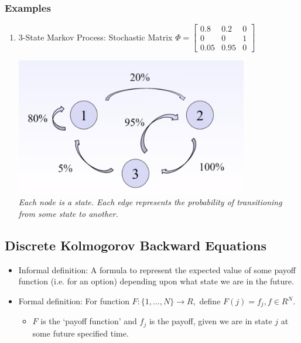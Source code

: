 \documentclass{article}
\begin{document}
\subsubsection{Examples}
\begin{enumerate}
    \item 3-State Markov Process: Stochastic Matrix $ \Phi = \begin{bmatrix}
        0.8 & 0.2 & 0 \\
        0 & 0 & 1 \\
        0.05 & 0.95 & 0 
        \end{bmatrix} $
        \begin{center}
            \centering
            \includegraphics[width=0.8\textwidth]{imgs/stochastic_matrices1.png} \\
            \textit{Each node is a state. Each edge represents the probability of 
            transitioning from some state to another.}
        \end{center}
\end{enumerate}

\subsection{Discrete Kolmogorov Backward Equations}
\begin{itemize}
    \item Informal definition: 
    A formula to represent the expected value of some payoff function (i.e. for
    an option) depending upon what state we are in the future.
    \item Formal definition: For function $ F : \{ 1, \dots, N \}  \rightarrow R
    , $ define $ F(j) = f_j, f \in R^N $.
    \begin{itemize}
        \item $ F $ is the `payoff function' and $ f_j $ is the payoff, given we 
        are in state $ j $ at some future specified time.
    \end{itemize}
\end{itemize}
\end{document}
